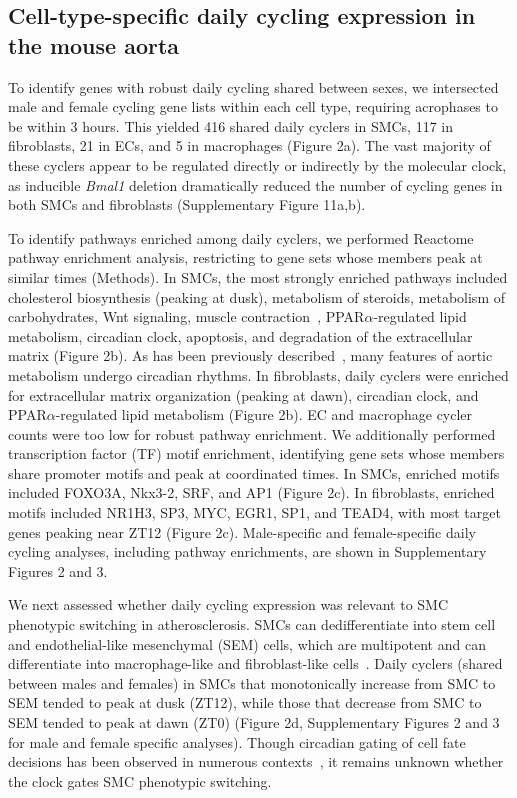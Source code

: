 \documentclass[12pt]{article}
\begin{document}
\subsection*{Cell-type-specific daily cycling expression in the mouse aorta}

To identify genes with robust daily cycling shared between sexes, we intersected male and female
cycling gene lists within each cell type, requiring acrophases to be within 3 hours. This yielded
416 shared daily cyclers in SMCs, 117 in fibroblasts, 21 in ECs, and 5 in macrophages
(Figure 2a). The vast majority of these cyclers appear to be regulated directly or indirectly by the
molecular clock, as inducible \textit{Bmal1} deletion dramatically reduced the number of cycling
genes in both SMCs and fibroblasts (Supplementary Figure 11a,b).

To identify pathways enriched among daily cyclers, we performed Reactome pathway enrichment
analysis, restricting to gene sets whose members peak at similar times (Methods). In SMCs, the most
strongly enriched pathways included cholesterol biosynthesis (peaking at dusk), metabolism of
steroids, metabolism of carbohydrates, Wnt signaling, muscle contraction~\cite{ref41,ref42,ref43},
PPAR$\alpha$-regulated lipid metabolism, circadian clock, apoptosis, and degradation of the
extracellular matrix (Figure 2b). As has been previously described~\cite{ref41}, many
features of aortic metabolism undergo circadian rhythms. In fibroblasts, daily cyclers were enriched
for extracellular matrix organization (peaking at dawn), circadian clock, and PPAR$\alpha$-regulated
lipid metabolism (Figure 2b). EC and macrophage cycler counts were too low for robust
pathway enrichment. We additionally performed transcription factor (TF) motif enrichment,
identifying gene sets whose members share promoter motifs and peak at coordinated times. In SMCs,
enriched motifs included FOXO3A, Nkx3-2, SRF, and AP1 (Figure 2c). In fibroblasts,
enriched motifs included NR1H3, SP3, MYC, EGR1, SP1, and TEAD4, with most target genes peaking near
ZT12 (Figure 2c). Male-specific and female-specific daily cycling analyses, including
pathway enrichments, are shown in Supplementary Figures 2 and
3.

We next assessed whether daily cycling expression was relevant to SMC phenotypic switching in
atherosclerosis. SMCs can dedifferentiate into stem cell and endothelial-like mesenchymal (SEM)
cells, which are multipotent and can differentiate into macrophage-like and fibroblast-like
cells~\cite{ref35,ref37,ref38,ref39}. Daily cyclers (shared between males and females) in SMCs that monotonically increase from SMC to
SEM tended to peak at dusk (ZT12), while those that decrease from SMC to SEM tended to peak at dawn
(ZT0) (Figure 2d, Supplementary Figures 2 and 3 for male and female specific analyses). Though circadian gating of cell fate decisions has been observed in
numerous contexts~\cite{ref69,ref70,ref71}, it remains unknown whether the clock gates SMC
phenotypic switching.
\end{document}
